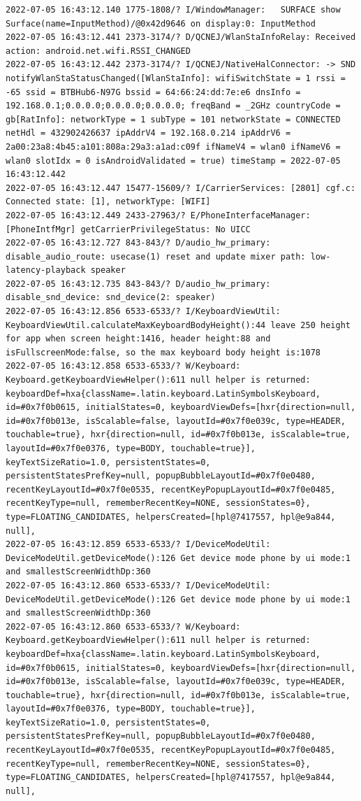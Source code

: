 \documentclass[a4paper,12pt]{book}
\begin{document}
\begin{lstlisting}
2022-07-05 16:43:12.140 1775-1808/? I/WindowManager:   SURFACE show Surface(name=InputMethod)/@0x42d9646 on display:0: InputMethod
2022-07-05 16:43:12.441 2373-3174/? D/QCNEJ/WlanStaInfoRelay: Received action: android.net.wifi.RSSI_CHANGED
2022-07-05 16:43:12.442 2373-3174/? I/QCNEJ/NativeHalConnector: -> SND notifyWlanStaStatusChanged([WlanStaInfo]: wifiSwitchState = 1 rssi = -65 ssid = BTBHub6-N97G bssid = 64:66:24:dd:7e:e6 dnsInfo = 192.168.0.1;0.0.0.0;0.0.0.0;0.0.0.0; freqBand = _2GHz countryCode = gb[RatInfo]: networkType = 1 subType = 101 networkState = CONNECTED netHdl = 432902426637 ipAddrV4 = 192.168.0.214 ipAddrV6 = 2a00:23a8:4b45:a101:808a:29a3:a1ad:c09f ifNameV4 = wlan0 ifNameV6 = wlan0 slotIdx = 0 isAndroidValidated = true) timeStamp = 2022-07-05 16:43:12.442
2022-07-05 16:43:12.447 15477-15609/? I/CarrierServices: [2801] cgf.c: Connected state: [1], networkType: [WIFI]
2022-07-05 16:43:12.449 2433-27963/? E/PhoneInterfaceManager: [PhoneIntfMgr] getCarrierPrivilegeStatus: No UICC
2022-07-05 16:43:12.727 843-843/? D/audio_hw_primary: disable_audio_route: usecase(1) reset and update mixer path: low-latency-playback speaker
2022-07-05 16:43:12.735 843-843/? D/audio_hw_primary: disable_snd_device: snd_device(2: speaker)
2022-07-05 16:43:12.856 6533-6533/? I/KeyboardViewUtil: KeyboardViewUtil.calculateMaxKeyboardBodyHeight():44 leave 250 height for app when screen height:1416, header height:88 and isFullscreenMode:false, so the max keyboard body height is:1078
2022-07-05 16:43:12.858 6533-6533/? W/Keyboard: Keyboard.getKeyboardViewHelper():611 null helper is returned: keyboardDef=hxa{className=.latin.keyboard.LatinSymbolsKeyboard, id=#0x7f0b0615, initialStates=0, keyboardViewDefs=[hxr{direction=null, id=#0x7f0b013e, isScalable=false, layoutId=#0x7f0e039c, type=HEADER, touchable=true}, hxr{direction=null, id=#0x7f0b013e, isScalable=true, layoutId=#0x7f0e0376, type=BODY, touchable=true}], keyTextSizeRatio=1.0, persistentStates=0, persistentStatesPrefKey=null, popupBubbleLayoutId=#0x7f0e0480, recentKeyLayoutId=#0x7f0e0535, recentKeyPopupLayoutId=#0x7f0e0485, recentKeyType=null, rememberRecentKey=NONE, sessionStates=0}, type=FLOATING_CANDIDATES, helpersCreated=[hpl@7417557, hpl@e9a844, null], 
2022-07-05 16:43:12.859 6533-6533/? I/DeviceModeUtil: DeviceModeUtil.getDeviceMode():126 Get device mode phone by ui mode:1 and smallestScreenWidthDp:360
2022-07-05 16:43:12.860 6533-6533/? I/DeviceModeUtil: DeviceModeUtil.getDeviceMode():126 Get device mode phone by ui mode:1 and smallestScreenWidthDp:360
2022-07-05 16:43:12.860 6533-6533/? W/Keyboard: Keyboard.getKeyboardViewHelper():611 null helper is returned: keyboardDef=hxa{className=.latin.keyboard.LatinSymbolsKeyboard, id=#0x7f0b0615, initialStates=0, keyboardViewDefs=[hxr{direction=null, id=#0x7f0b013e, isScalable=false, layoutId=#0x7f0e039c, type=HEADER, touchable=true}, hxr{direction=null, id=#0x7f0b013e, isScalable=true, layoutId=#0x7f0e0376, type=BODY, touchable=true}], keyTextSizeRatio=1.0, persistentStates=0, persistentStatesPrefKey=null, popupBubbleLayoutId=#0x7f0e0480, recentKeyLayoutId=#0x7f0e0535, recentKeyPopupLayoutId=#0x7f0e0485, recentKeyType=null, rememberRecentKey=NONE, sessionStates=0}, type=FLOATING_CANDIDATES, helpersCreated=[hpl@7417557, hpl@e9a844, null], 

\end{lstlisting}
\end{document}
